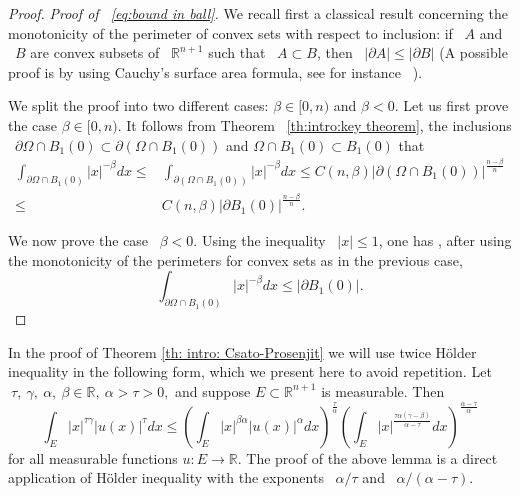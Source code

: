 \documentclass[reqno,12pt]{amsart}
\newcommand{\R}{\mathbb{R}}
\newcommand{\delomega}{\partial\Omega}
\numberwithin{equation}{section}
\theoremstyle{plain}
\theoremstyle{definition}
\renewcommand{\leq}{\leqslant}
\begin{document}
\begin{proof}
\textit{Proof of ~\eqref{eq:bound in ball}.} 
We recall first a classical result concerning the monotonicity of the perimeter of convex sets with respect to inclusion: if ~$A$ and ~$B$ are convex subsets of ~$\R^{n+1}$ such that ~$A\subset B$, then ~$|\partial A|\leq|\partial B|$ (A possible proof is by using Cauchy's surface area formula, see for instance ~\cite[Proposition A.2 in the Appendix]{Cabre-Cozzi-Csato}).

We split the proof into two different cases: $\beta\in[0,n)$ and $\beta<0.$ Let us first prove the case $\beta\in [0,n).$ 
It follows from Theorem ~\ref{th:intro:key theorem}, the inclusions ~$\partial\Omega\cap B_1(0)\subset \partial(\Omega\cap B_1(0))$ and $\Omega\cap B_1(0)\subset B_1(0)$ that
\begin{align*}
  \int_{\delomega\cap B_1(0)}|x|^{-\beta}dx
  \leq &
  \int_{\partial(\Omega \cap B_1(0))}|x|^{-\beta}dx
  \leq  C(n,\beta) |\partial(\Omega \cap B_1(0))|^{\frac{n-\beta}{n}}
  \\
  \leq &
  C(n,\beta)|\partial B_1(0)|^{\frac{n-\beta}{n}}.
\end{align*} 

We now prove the case  ~$\beta < 0$. Using the inequality ~$|x|\leq 1$, one has , after using the monotonicity of the perimeters  for convex sets as in the previous case,
$$\int_{\delomega\cap B_1(0)}|x|^{-\beta}dx
  \leq |\partial B_1(0)|.$$
\end{proof}


In the proof of Theorem \ref{th: intro: Csato-Prosenjit} we will use twice H\"older inequality in the following form, which we present here to avoid repetition. Let $~\tau, ~\gamma, ~\alpha, ~\beta \in \mathbb{R}, ~\alpha  > \tau>0,$ and suppose $E \subset \R^{n+1}$ is measurable. Then 
\begin{equation}
    \label{lemma: sec 4: Holder type}
    \int_{E}|x|^{\tau\gamma}|u(x)|^\tau dx \leq \left( \int_E |x|^{\beta\alpha}|u(x)|^\alpha dx\right)^{\frac{\tau}{\alpha}} \left( \int_E|x|^{\frac{\tau\alpha(\gamma - \beta)}{\alpha -\tau}}dx\right)^{\frac{\alpha -\tau}{\alpha}}
\end{equation}
for all measurable functions $u:E\to\R$.  
The proof of the above lemma is a direct application of H\"older inequality with the exponents ~$\alpha/\tau$ and ~$\alpha/(\alpha-\tau)$.
\end{document}
